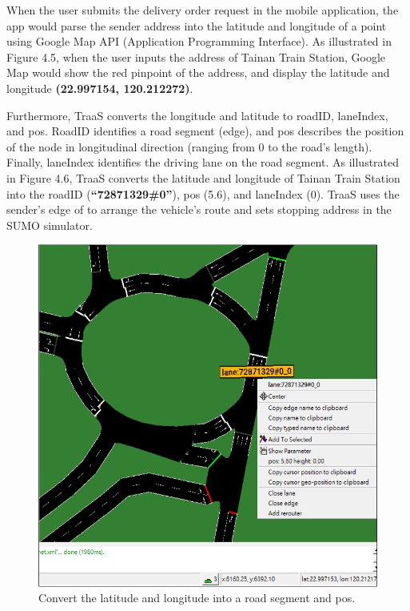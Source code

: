 \documentclass[12pt]{ksthesis}
\begin{document}
\begin{thesis}
{When the user submits the delivery order request in the mobile application, the app would parse the sender address into the latitude and longitude of a point using Google Map API (Application Programming Interface).
As illustrated in Figure 4.5, when the user inputs the address of Tainan Train Station, Google Map would show the red pinpoint of the address, and display the latitude and longitude \textbf{(22.997154, 120.212272)}.

Furthermore, TraaS converts the longitude and latitude to roadID, laneIndex, and pos. RoadID identifies a road segment (edge), and pos describes the position of the node in longitudinal direction (ranging from 0 to the road's length). Finally, laneIndex identifies the driving lane on the road segment.
As illustrated in Figure 4.6, TraaS converts the latitude and longitude of Tainan Train Station into the roadID (\textbf{“72871329\#0”}), pos (5.6), and laneIndex (0).
TraaS uses the sender’s edge of to arrange the vehicle’s route and sets stopping address in the SUMO simulator.

\begin{figure}[t]
\centering
\includegraphics[scale=1.0]{./Thesis_figures/F4-6_GPS_SUMOMap.PNG}
\caption{\large Convert the latitude and longitude into a road segment and pos.}
\vspace{0.5cm}
\label{Fig:Convert_To_Road}
\end{figure}




}
\end{thesis}
\end{document}
